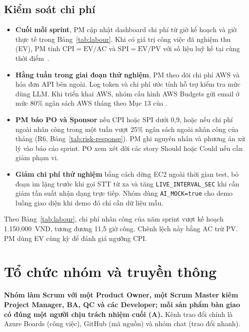 \documentclass[12pt,a4paper]{report}
\begin{document}
\needspace{.50\textheight}
\section{Kiểm soát chi phí}

\begin{itemize}
  \item \textbf{Cuối mỗi sprint}, PM cập nhật dashboard chi phí từ giờ kế hoạch và giờ thực tế trong
        Bảng~\ref{tab:labour}. Khi có giá trị công việc đã nghiệm thu (EV), PM tính $\mathrm{CPI}=\mathrm{EV}/\mathrm{AC}$
        và $\mathrm{SPI}=\mathrm{EV}/\mathrm{PV}$ với số liệu luỹ kế tại cùng thời điểm~\cite{mcr}.
  \item \textbf{Hằng tuần trong giai đoạn thử nghiệm}, PM theo dõi chi phí AWS và hóa đơn API bên ngoài.
        Log token và chi phí ước tính hỗ trợ kiểm tra mức dùng LLM. Khi triển khai AWS, nhóm cấu hình AWS Budgets
        gửi email ở mức 80\% ngân sách AWS tháng theo Mục 13 của .
  \item \textbf{PM báo PO và Sponsor} nếu CPI hoặc SPI dưới 0,9, hoặc nếu chi phí ngoài nhân công
        trong một tuần vượt 25\% ngân sách ngoài nhân công của tháng (R6, Bảng~\ref{tab:risk-response}). PM ghi nguyên
        nhân và phương án xử lý vào báo cáo sprint. PO xem xét dời các story Should hoặc Could nếu cần giảm phạm vi.
  \item \textbf{Giảm chi phí thử nghiệm} bằng cách dừng EC2 ngoài thời gian test, bỏ đoạn im lặng trước khi gọi
        STT từ xa và tăng \texttt{LIVE\_INTERVAL\_SEC} khi cần giảm tần suất nhận dạng trực tiếp. Nhóm dùng
        \texttt{AI\_MOCK=true} cho demo luồng giao diện khi demo đó chỉ cần dữ liệu mẫu.
\end{itemize}

Theo Bảng~\ref{tab:labour}, chi phí nhân công của năm sprint vượt kế hoạch 1.150.000~VND, tương đương 11,5 giờ
công. Chênh lệch này bằng AC trừ PV. PM dùng EV cùng kỳ để đánh giá ngưỡng CPI.

\chapter{Tổ chức nhóm và truyền thông}
\label{chap:team}

\textbf{Nhóm làm Scrum với một Product Owner, một Scrum Master kiêm Project Manager, BA, QC và các Developer; mỗi
sản phẩm bàn giao có đúng một người chịu trách nhiệm cuối (A).} Kênh trao đổi chính là Azure Boards (công việc),
GitHub (mã nguồn) và nhóm chat (trao đổi nhanh).
\end{document}
